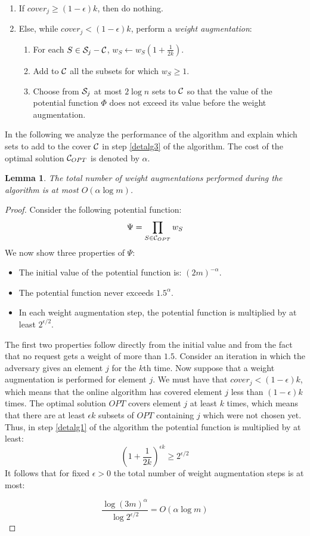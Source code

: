 \documentclass{sig-alternate}
\newtheorem{lemma}[theorem]{Lemma}
\def \CC   {{\cal C}}
\def \SS   {{\cal S}}
\begin{document}
\begin{enumerate}
    \item If $cover_j \geq (1-\epsilon)k$, then do nothing.
    \item Else, while $cover_j < (1-\epsilon)k$, perform a {\em weight augmentation}:
    \begin{enumerate}
        \item For each $S \in \SS_j - \CC$, $w_S \gets w_S(1+\frac{1}{2k})$.\label{detalg1}
        \item Add to $\CC$ all the subsets for which $w_S \geq 1$.\label{detalg2}
        \item Choose from $\SS_j$ at most $2 \log n$ sets to $\CC$\label{detalg3}
        so that the value of the potential function $\Phi$ does
        not exceed its value before the weight augmentation.
    \end{enumerate}
\end{enumerate}

In the following we analyze the performance of the algorithm and
explain which sets to add to the cover $\CC$ in step \ref{detalg3}
of the algorithm. The cost of the optimal solution $\CC_{OPT}$ is
denoted by $\alpha$.

\begin{lemma}\label{det_steps}
The total number of weight augmentations performed during the
algorithm is at most $O(\alpha \log m)$.
\end{lemma}

\begin{proof}
Consider the following potential function:
$$ \Psi = \prod_{S \in \CC_{OPT}} w_S$$
We now show three properties of $\Psi$:
\begin{itemize}
    \item The initial value of the potential function is:
    $(2m)^{-\alpha}$.
    \item The potential function never exceeds $1.5^{\alpha}$.
    \item In each weight augmentation step, the potential function
    is multiplied by at least $2^{\epsilon/2}$.
\end{itemize}
The first two properties follow directly from the initial value
and from the fact that no request gets a weight of more than
$1.5$. Consider an iteration in which the adversary gives an
element $j$ for the $k$th time. Now suppose that a weight
augmentation is performed for element $j$. We must have that
$cover_j < (1-\epsilon)k$, which means that the online algorithm
has covered element $j$ less than $(1-\epsilon)k$ times. The
optimal solution $OPT$ covers element $j$ at least $k$ times,
which means that there are at least $\epsilon k$ subsets of $OPT$
containing $j$ which were not chosen yet. Thus, in step
\ref{detalg1} of the algorithm the potential function is
multiplied by at least:
$$
(1+\frac{1}{2k})^{\epsilon k} \geq 2^{\epsilon / 2}
$$
It follows that for fixed $\epsilon>0$ the total number of weight
augmentation steps is at most:

$$
\frac{\log (3m)^\alpha}{\log 2^{\epsilon / 2}} = O(\alpha \log m)
$$
\end{proof}
\end{document}
